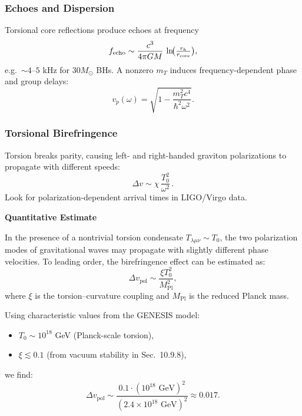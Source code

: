 \documentclass{article}
\begin{document}
\subsubsection{ Echoes and Dispersion}
Torsional core reflections produce echoes at frequency
\begin{equation}\label{eq:auto173}
f_{\rm echo}\sim \frac{c^3}{4\pi GM}\,\ln\!\bigl(\tfrac{r_h}{r_{\rm core}}\bigr),
\end{equation}
e.g.\ \(\sim4\text{–}5\) kHz for \(30M_\odot\) BHs.  A nonzero \(m_T\) induces
frequency-dependent phase and group delays:
\begin{equation}\label{eq:auto174}
v_p(\omega)=\sqrt{1 - \frac{m_T^2c^4}{\hbar^2\omega^2}}.
\end{equation}

\subsubsection{ Torsional Birefringence}
Torsion breaks parity, causing left- and right-handed graviton polarizations
to propagate with different speeds:
\begin{equation}\label{eq:auto175}
\Delta v \sim \chi\,\frac{T_0^2}{\omega^2}\,.
\end{equation}
Look for polarization-dependent arrival times in LIGO/Virgo data.

\vspace{1em}
\noindent \textbf{Quantitative Estimate}

In the presence of a nontrivial torsion condensate $T_{\lambda\mu\nu} \sim T_0$, the two polarization modes of gravitational waves may propagate with slightly different phase velocities. To leading order, the birefringence effect can be estimated as:
\begin{equation}
\Delta v_{\text{pol}} \sim \frac{\xi T_0^2}{M_{\text{Pl}}^2},
\end{equation}
where $\xi$ is the torsion–curvature coupling and $M_{\text{Pl}}$ is the reduced Planck mass.

Using characteristic values from the GENESIS model:
\begin{itemize}
    \item $T_0 \sim 10^{18}$ GeV (Planck-scale torsion),
    \item $\xi \lesssim 0.1$ (from vacuum stability in Sec.~10.9.8),
\end{itemize}
we find:
\begin{equation}\label{eq:auto176}
\Delta v_{\text{pol}} \sim \frac{0.1 \cdot (10^{18} \text{ GeV})^2}{(2.4 \times 10^{18} \text{ GeV})^2} \approx 0.017.
\end{equation}
\end{document}
